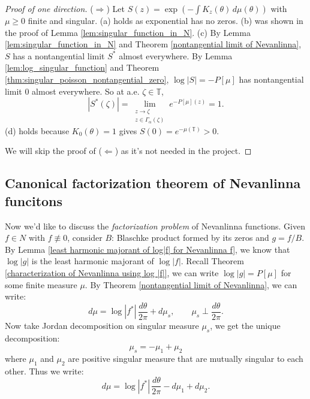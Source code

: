 \begin{proof}[Proof of one direction]
($\Rightarrow$) Let $S(z)=\exp\left(-\int K_z(\theta)\,d\mu(\theta)\right)$ with $\mu\geq 0$
finite and singular.
(a) holds as exponential has no zeros.
(b) was shown in the proof of Lemma \ref{lem:singular_function_in_N}.
(c) By Lemma \ref{lem:singular_function_in_N} and Theorem \ref{nontangential limit of Nevanlinna},
$S$ has a nontangential limit $S^*$ almost everywhere. By Lemma \ref{lem:log_singular_function}
and Theorem \ref{thm:singular_poisson_nontangential_zero}, $\log|S|=-P[\mu]$ has nontangential
limit $0$ almost everywhere. So at a.e. $\zeta\in\mathbb{T}$,
\begin{equation*}
  |S^*(\zeta)|=\lim_{\substack{z\to\zeta\\ z\in\Gamma_\alpha(\zeta)}}e^{-P[\mu](z)}=1.
\end{equation*}
(d) holds because $K_0(\theta)=1$ gives $S(0)=e^{-\mu(\mathbb{T})}>0$.

We will skip the proof of ($\Leftarrow$) as it's not needed in the project.
\end{proof}



\subsection{Canonical factorization theorem of Nevanlinna funcitons}
Now we'd like to discuss the \textit{factorization problem} of Nevanlinna functions.
Given $f\in N$ with $f\not\equiv 0$, consider $B$: Blaschke product formed by
its zeros and $g=f/B$. By Lemma \ref{least harmonic majorant of log|f| for Nevanlinna f},
we know that $\log|g|$ is the least harmonic majorant of $\log |f|$. Recall 
Theorem \ref{characterization of Nevanlinna using log |f|}, we can write 
$\log |g|=P[\mu]$ for some finite measure $\mu$. By Theorem \ref{nontangential limit of Nevanlinna},
we can write:
\begin{equation*}
  d\mu=\log|f^*|\,\frac{d\theta}{2\pi}+d\mu_s,
  \qquad \mu_s\perp\frac{d\theta}{2\pi}.
\end{equation*}
Now take Jordan decomposition on singular measure
 $\mu_s$, we get the unique decomposition:
 \begin{equation*}
  \mu_s=-\mu_1+\mu_2
 \end{equation*}
 where $\mu_1$ and $\mu_2$ are positive singular measure that are mutually singular to each other. Thus we 
write:
\begin{equation*}
  d\mu=\log|f^*|\,\frac{d\theta}{2\pi}-d\mu_1+d\mu_2.
\end{equation*}

